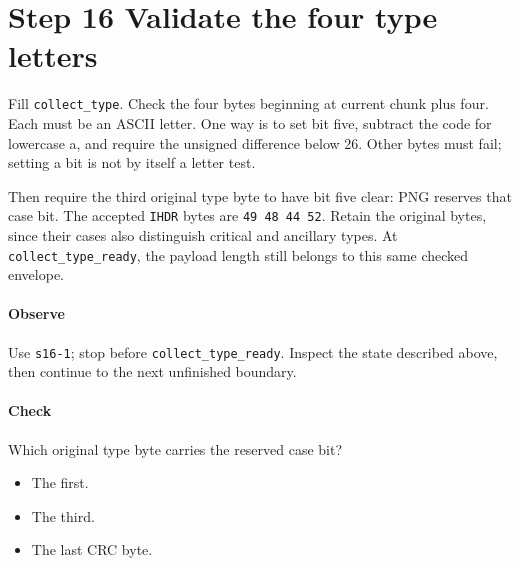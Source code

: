 \section{Step 16 Validate the four type letters}\label{png-collect-s16}
Fill \texttt{collect\_type}. Check the four bytes beginning at current chunk plus four. Each must be an ASCII letter. One way is to set bit five, subtract the code for lowercase a, and require the unsigned difference below 26. Other bytes must fail; setting a bit is not by itself a letter test.

Then require the third original type byte to have bit five clear: PNG reserves that case bit. The accepted \texttt{IHDR} bytes are \texttt{49 48 44 52}. Retain the original bytes, since their cases also distinguish critical and ancillary types. At \texttt{collect\_type\_ready}, the payload length still belongs to this same checked envelope.

\paragraph{Observe} Use \texttt{s16-1}; stop before \texttt{collect\_type\_ready}. Inspect the state described above, then continue to the next unfinished boundary.

\paragraph{Check} Which original type byte carries the reserved case bit?
\begin{itemize}
  \item[A.] The first.
  \item[B.] The third.
  \item[C.] The last CRC byte.
\end{itemize}
